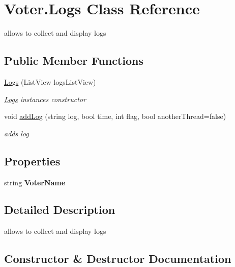 \hypertarget{class_voter_1_1_logs}{}\section{Voter.\+Logs Class Reference}
\label{class_voter_1_1_logs}


allows to collect and display logs  


\subsection*{Public Member Functions}
\begin{DoxyCompactItemize}
\item 
\hyperlink{class_voter_1_1_logs_a37904e9fa4c48bcc1a540c6685484e7d}{Logs} (List\+View logs\+List\+View)
\begin{DoxyCompactList}\small\item\em \hyperlink{class_voter_1_1_logs}{Logs} instance\textquotesingle{}s constructor \end{DoxyCompactList}\item 
void \hyperlink{class_voter_1_1_logs_aac5ba38a4fecfd5026d039969e05a2ed}{add\+Log} (string log, bool time, int flag, bool another\+Thread=false)
\begin{DoxyCompactList}\small\item\em adds log \end{DoxyCompactList}\end{DoxyCompactItemize}
\subsection*{Properties}
\begin{DoxyCompactItemize}
\item 
\hypertarget{class_voter_1_1_logs_a9252e7d84515eb59a4b0ff9c4cc09156}{}string {\bfseries Voter\+Name}\label{class_voter_1_1_logs_a9252e7d84515eb59a4b0ff9c4cc09156}

\end{DoxyCompactItemize}


\subsection{Detailed Description}
allows to collect and display logs 



\subsection{Constructor \& Destructor Documentation}
\hypertarget{class_voter_1_1_logs_a37904e9fa4c48bcc1a540c6685484e7d}{}
